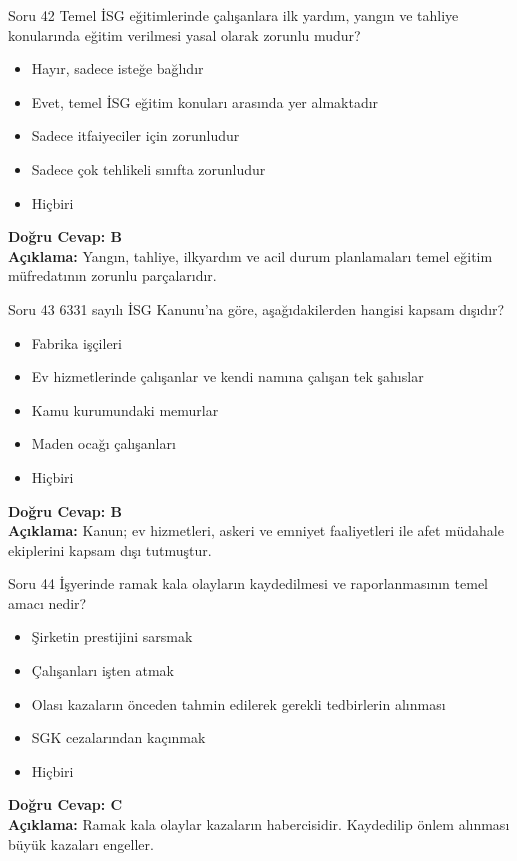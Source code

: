 \documentclass[12pt,a4paper]{article}
\begin{document}
\begin{testcard}{Soru 42}
    Temel İSG eğitimlerinde çalışanlara ilk yardım, yangın ve tahliye konularında eğitim verilmesi yasal olarak zorunlu mudur?
    \begin{itemize}
        \item[A)] Hayır, sadece isteğe bağlıdır
        \item[B)] Evet, temel İSG eğitim konuları arasında yer almaktadır
        \item[C)] Sadece itfaiyeciler için zorunludur
        \item[D)] Sadece çok tehlikeli sınıfta zorunludur
        \item[E)] Hiçbiri
    \end{itemize}
    \tcblower
    \textbf{Doğru Cevap: B} \\
    \textbf{Açıklama:} Yangın, tahliye, ilkyardım ve acil durum planlamaları temel eğitim müfredatının zorunlu parçalarıdır.
\end{testcard}

\begin{testcard}{Soru 43}
    6331 sayılı İSG Kanunu'na göre, aşağıdakilerden hangisi kapsam dışıdır?
    \begin{itemize}
        \item[A)] Fabrika işçileri
        \item[B)] Ev hizmetlerinde çalışanlar ve kendi namına çalışan tek şahıslar
        \item[C)] Kamu kurumundaki memurlar
        \item[D)] Maden ocağı çalışanları
        \item[E)] Hiçbiri
    \end{itemize}
    \tcblower
    \textbf{Doğru Cevap: B} \\
    \textbf{Açıklama:} Kanun; ev hizmetleri, askeri ve emniyet faaliyetleri ile afet müdahale ekiplerini kapsam dışı tutmuştur.
\end{testcard}

\begin{testcard}{Soru 44}
    İşyerinde ramak kala olayların kaydedilmesi ve raporlanmasının temel amacı nedir?
    \begin{itemize}
        \item[A)] Şirketin prestijini sarsmak
        \item[B)] Çalışanları işten atmak
        \item[C)] Olası kazaların önceden tahmin edilerek gerekli tedbirlerin alınması
        \item[D)] SGK cezalarından kaçınmak
        \item[E)] Hiçbiri
    \end{itemize}
    \tcblower
    \textbf{Doğru Cevap: C} \\
    \textbf{Açıklama:} Ramak kala olaylar kazaların habercisidir. Kaydedilip önlem alınması büyük kazaları engeller.
\end{testcard}
\end{document}

